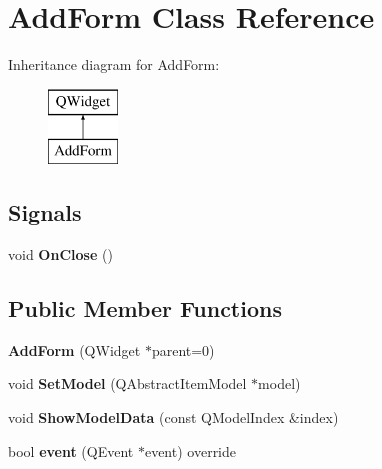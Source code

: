 \hypertarget{class_add_form}{}\section{Add\+Form Class Reference}
\label{class_add_form}
Inheritance diagram for Add\+Form\+:\begin{figure}[H]
\begin{center}
\leavevmode
\includegraphics[height=2.000000cm]{class_add_form}
\end{center}
\end{figure}
\subsection*{Signals}
\begin{DoxyCompactItemize}
\item 
\mbox{\label{class_add_form_aa161d4984cedd6ca6cc3dab1641beeea}} 
void {\bfseries On\+Close} ()
\end{DoxyCompactItemize}
\subsection*{Public Member Functions}
\begin{DoxyCompactItemize}
\item 
\mbox{\label{class_add_form_a623e493b6c6cb526d2a624010fe6efca}} 
{\bfseries Add\+Form} (Q\+Widget $\ast$parent=0)
\item 
\mbox{\label{class_add_form_a2edb1f6faa703e3f5129bb91907964d1}} 
void {\bfseries Set\+Model} (Q\+Abstract\+Item\+Model $\ast$model)
\item 
\mbox{\label{class_add_form_a8d77f148efbb818939d10821e6a3c6fd}} 
void {\bfseries Show\+Model\+Data} (const Q\+Model\+Index \&index)
\item 
\mbox{\label{class_add_form_a488387f47577f8742c920e761e9e2c63}} 
bool {\bfseries event} (Q\+Event $\ast$event) override
\end{DoxyCompactItemize}


